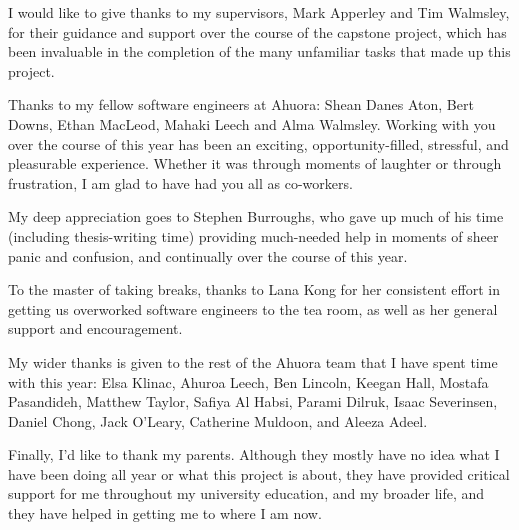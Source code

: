 \documentclass[12pt,a4paper]{uwthesis17}
\begin{document}
\begin{acknowledgements}

\noindent I would like to give thanks to my supervisors, Mark Apperley and Tim Walmsley, for their guidance and support over the course of the capstone project, which has been invaluable in the completion of the many unfamiliar tasks that made up this project.

\vspace{0.5cm}

\noindent Thanks to my fellow software engineers at Ahuora: Shean Danes Aton, Bert Downs, Ethan MacLeod, Mahaki Leech and Alma Walmsley. Working with you over the course of this year has been an exciting, opportunity-filled, stressful, and pleasurable experience. Whether it was through moments of laughter or through frustration, I am glad to have had you all as co-workers.

\vspace{0.5cm}

\noindent My deep appreciation goes to Stephen Burroughs, who gave up much of his time (including thesis-writing time) providing much-needed help in moments of sheer panic and confusion, and continually over the course of this year.

\vspace{0.5cm}

\noindent To the master of taking breaks, thanks to Lana Kong for her consistent effort in getting us overworked software engineers to the tea room, as well as her general support and encouragement.

\vspace{0.5cm}

\noindent My wider thanks is given to the rest of the Ahuora team that I have spent time with this year: Elsa Klinac, Ahuroa Leech, Ben Lincoln, Keegan Hall, Mostafa Pasandideh, Matthew Taylor, Safiya Al Habsi, Parami Dilruk, Isaac Severinsen, Daniel Chong, Jack O'Leary, Catherine Muldoon, and Aleeza Adeel.

\vspace{0.5cm}

\noindent Finally, I'd like to thank my parents. Although they mostly have no idea what I have been doing all year or what this project is about, they have provided critical support for me throughout my university education, and my broader life, and they have helped in getting me to where I am now.

\end{acknowledgements}
\end{document}
